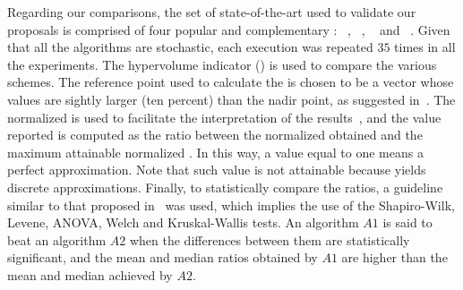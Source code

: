 Regarding our comparisons, the set of state-of-the-art \MOEAS{} used to validate our proposals is comprised of four 
popular and complementary \MOEAS{}: \NSGAII{}~\cite{deb2002fast}, \MOEADDE{}~\cite{zhang2009performance}, \RMOEA{}~\cite{trautmann2013r2} 
and \NSGAIII{}~\cite{deb2013evolutionary}.
%
%
%
Given that all the algorithms are stochastic, each execution was repeated $35$ times in all the experiments.
%
The hypervolume indicator (\HV{}) is used to compare the various schemes.
%
The reference point used to calculate the \HV{} is chosen to be a vector whose values are sightly larger (ten percent) 
than the nadir point, as suggested in~\cite{ishibuchi2017reference}.
%
The normalized \HV{} is used to facilitate the interpretation of the results~\cite{li2014evolutionary}, 
and the value reported is computed as the ratio between the normalized \HV{} obtained and the maximum attainable normalized \HV{}.
%
In this way, a value equal to one means a perfect approximation.
%
Note that such value is not attainable because \MOEAS{} yields discrete approximations.
%
Finally, to statistically compare the \HV{} ratios, a guideline similar to that proposed in~\cite{durillo2010study} was used, 
which implies the use of the Shapiro-Wilk, Levene, ANOVA, Welch and Kruskal-Wallis tests.
%
An algorithm $A1$ is said to beat an algorithm $A2$ when the differences between them are statistically significant, 
and the mean and median \HV{} ratios obtained by $A1$ are higher than the mean and median achieved by $A2$.

%
%
%
%
%

